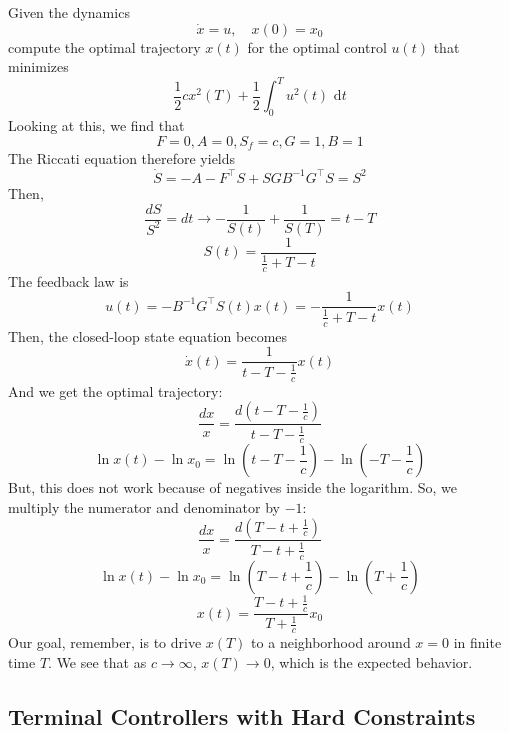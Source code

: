 \documentclass{article}
\begin{document}
\noindent
Given the dynamics
\[\dot{x} = u, \quad x(0) = x_0\]
compute the optimal trajectory $x(t)$ for the optimal control $u(t)$ that minimizes
\[\frac{1}{2}cx^2(T) + \frac{1}{2}\int_{0}^{T}u^2(t)\text{ d}t\]
Looking at this, we find that
\[F = 0, A = 0, S_f = c, G = 1, B = 1\]
The Riccati equation therefore yields
\[\dot{S} = -A-F^\top S+SGB^{-1}G^\top S = S^2\]
Then,
\[\frac{dS}{S^2} = dt \rightarrow -\frac{1}{S(t)} + \frac{1}{S(T)} = t-T\]
\[S(t) = \frac{1}{\frac{1}{c}+T-t}\]
The feedback law is
\[u(t) = -B^{-1}G^\top S(t)x(t) = -\frac{1}{\frac{1}{c}+T-t}x(t)\]
Then, the closed-loop state equation becomes
\[\dot{x}(t) = \frac{1}{t-T-\frac{1}{c}}x(t)\]
And we get the optimal trajectory:
\[\frac{dx}{x} = \frac{d(t-T-\frac{1}{c})}{t-T-\frac{1}{c}}\]
\[\ln x(t) - \ln x_0 = \ln\left(t-T-\frac{1}{c}\right)-\ln\left(-T-\frac{1}{c}\right)\]
But, this does not work because of negatives inside the logarithm. So, we multiply
the numerator and denominator by $-1$:
\[\frac{dx}{x} = \frac{d(T-t+\frac{1}{c})}{T-t+\frac{1}{c}}\]
\[\ln x(t) - \ln x_0 = \ln\left(T-t+\frac{1}{c}\right)-\ln\left(T+\frac{1}{c}\right)\]
\[x(t) = \frac{T-t+\frac{1}{c}}{T+\frac{1}{c}}x_0\]
Our goal, remember, is to drive $x(T)$ to a neighborhood around $x = 0$ in finite time $T$.
We see that as $c \rightarrow \infty$, $x(T) \rightarrow 0$, which is the expected behavior.

\subsection{Terminal Controllers with Hard Constraints}
\end{document}
